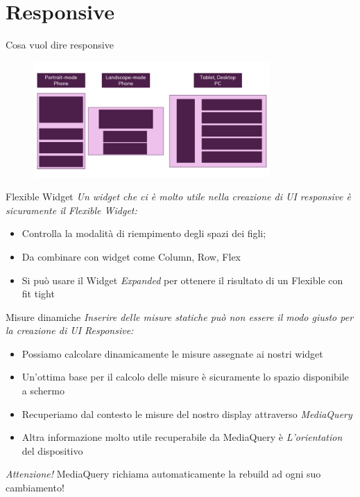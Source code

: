\documentclass{../libs/presentation_format}
\begin{document}

\section{Responsive}
\begin{frame}{Cosa vuol dire responsive}
\begin{figure}[htpb]
		\centering
		\includegraphics[width=9cm]{../libs/responsive-overview}
	\end{figure}
\end{frame}


\begin{frame}{Flexible Widget}
	\emph{Un widget che ci è molto utile nella creazione di UI responsive è sicuramente il \emph{Flexible Widget}:}
	\begin{itemize}
		\item Controlla la modalità di riempimento degli spazi dei figli;
		\item Da combinare con widget come Column, Row, Flex
		\item Si può usare il Widget \emph{Expanded} per ottenere il risultato di un Flexible con fit tight
	\end{itemize}
\end{frame}


\begin{frame}{Misure dinamiche}
	\emph{Inserire delle misure statiche può non essere il modo giusto per la creazione di UI Responsive:}
	\begin{itemize}
		\item Possiamo calcolare dinamicamente le misure assegnate ai nostri widget
		\item Un'ottima base per il calcolo delle misure è sicuramente lo spazio disponibile a schermo
		\item Recuperiamo dal contesto le misure del nostro display attraverso \emph{MediaQuery}
		\item Altra informazione molto utile recuperabile da MediaQuery è \emph{L'orientation} del dispositivo
	\end{itemize}
	\centering
	\emph{Attenzione!} MediaQuery richiama automaticamente la rebuild ad ogni suo cambiamento!
\end{frame}
\end{document}
